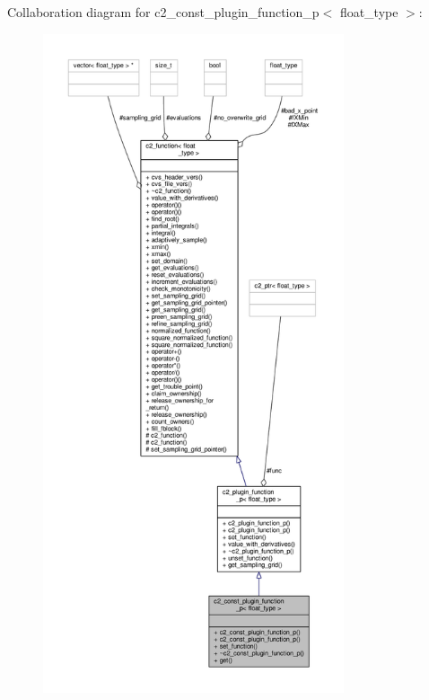 Collaboration diagram for c2\+\_\+const\+\_\+plugin\+\_\+function\+\_\+p$<$ float\+\_\+type $>$\+:
\nopagebreak
\begin{figure}[H]
\begin{center}
\leavevmode
\includegraphics[height=550pt]{classc2__const__plugin__function__p__coll__graph}
\end{center}
\end{figure}
